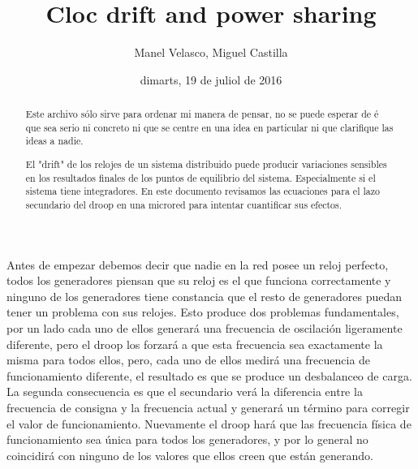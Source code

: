 \documentclass{tufte-handout}
\title{Cloc drift and power sharing}
\author[Manel Velasco, Miguel Castilla]{Manel Velasco, Miguel Castilla}
\date{dimarts, 19 de juliol de 2016}
\begin{document}
\maketitle%

\begin{abstract}
\noindent Este archivo sólo sirve para ordenar mi manera de pensar, no se puede esperar de é que sea serio ni concreto ni que se centre en una idea en particular ni que clarifique las ideas a nadie. 

El "drift" de los relojes de un sistema distribuido puede producir variaciones sensibles en los resultados finales de los puntos de equilibrio del sistema. Especialmente si el sistema tiene integradores. En este documento revisamos las ecuaciones para el lazo secundario del droop en una microred para intentar cuantificar sus efectos. 
\end{abstract}


Antes de empezar debemos decir que nadie en la red posee un reloj perfecto, todos los generadores piensan que su reloj es el que funciona correctamente y ninguno de los generadores tiene constancia que el resto de generadores puedan tener un problema con sus relojes. Esto produce dos problemas fundamentales, por un lado cada uno de ellos generará una frecuencia de oscilación ligeramente diferente, pero el droop los forzará a que esta frecuencia sea exactamente la misma para todos ellos, pero, cada uno de ellos medirá una frecuencia de funcionamiento diferente, el resultado es que se produce un desbalanceo de carga. La segunda consecuencia es que el secundario verá la diferencia entre la frecuencia de consigna y la frecuencia actual y generará un término para corregir el valor de funcionamiento. Nuevamente el droop hará que las frecuencia física de funcionamiento sea única para todos los generadores, y por lo general no coincidirá con ninguno de los valores que ellos creen que están generando. 
\end{document}
